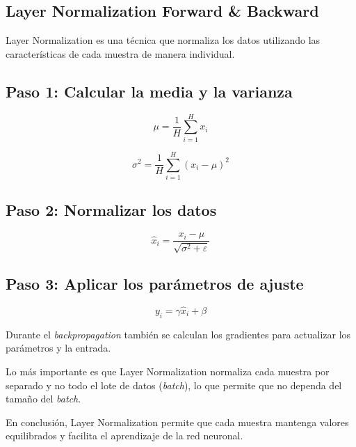 \documentclass[12pt]{article}
\begin{document}
\subsection{Layer Normalization Forward \& Backward}

Layer Normalization es una técnica que normaliza los datos utilizando las características de cada muestra de manera individual.

\subsection*{Paso 1: Calcular la media y la varianza}

\[
\mu=\frac{1}{H}\sum_{i=1}^{H}x_i
\]

\[
\sigma^2=\frac{1}{H}\sum_{i=1}^{H}(x_i-\mu)^2
\]

\subsection*{Paso 2: Normalizar los datos}

\[
\hat{x}_i=
\frac{x_i-\mu}
{\sqrt{\sigma^2+\varepsilon}}
\]

\subsection*{Paso 3: Aplicar los parámetros de ajuste}

\[
y_i=\gamma \hat{x}_i+\beta
\]

Durante el \textit{backpropagation} también se calculan los gradientes para actualizar los parámetros y la entrada.

Lo más importante es que Layer Normalization normaliza cada muestra por separado y no todo el lote de datos (\textit{batch}), lo que permite que no dependa del tamaño del \textit{batch}.

En conclusión, Layer Normalization permite que cada muestra mantenga valores equilibrados y facilita el aprendizaje de la red neuronal.

\newpage
\printbibliography
\end{document}
